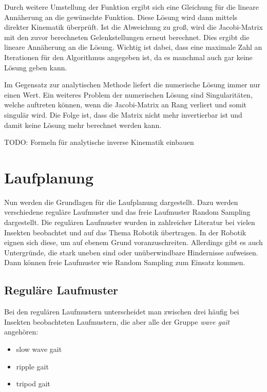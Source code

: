 Durch weitere Umstellung der Funktion ergibt sich eine Gleichung für die lineare Annäherung an die gewünschte Funktion. Diese Lösung wird dann mittels direkter Kinematik überprüft. Ist die Abweichung zu groß, wird die Jacobi-Matrix mit den zuvor berechneten Gelenkstellungen erneut berechnet. Dies ergibt die lineare Annäherung an die Lösung. Wichtig ist dabei, dass eine maximale Zahl an Iterationen für den Algorithmus angegeben ist, da es manchmal auch gar keine Lösung geben kann.

Im Gegensatz zur analytischen Methode liefert die numerische Lösung immer nur einen Wert. Ein weiteres Problem der numerischen Lösung sind Singularitäten, welche auftreten können, wenn die Jacobi-Matrix an Rang verliert und somit singulär wird. Die Folge ist, dass die Matrix nicht mehr invertierbar ist und damit keine Lösung mehr berechnet werden kann. 

TODO: Formeln für analytische inverse Kinematik einbauen

\section{Laufplanung}

Nun werden die Grundlagen für die Laufplanung dargestellt. Dazu werden verschiedene reguläre Laufmuster und das freie Laufmuster Random Sampling dargestellt. Die regulären Laufmuster wurden in zahlreicher Literatur bei vielen Insekten beobachtet und auf das Thema Robotik übertragen. \autocite{ferrell1995comparison} \autocite{wilson1966insect} In der Robotik eignen sich diese, um auf ebenem Grund voranzuschreiten. Allerdings gibt es auch Untergründe, die stark uneben sind oder unüberwindbare Hindernisse aufweisen. Dann können freie Laufmuster wie Random Sampling zum Einsatz kommen.

\subsection{Reguläre Laufmuster}

Bei den regulären Laufmustern unterscheidet man zwischen drei häufig bei Insekten beobachteten Laufmustern, die aber alle der Gruppe \emph{wave gait} angehören:
\begin{itemize}
\item slow wave gait
\item ripple gait
\item tripod gait
\end{itemize}


